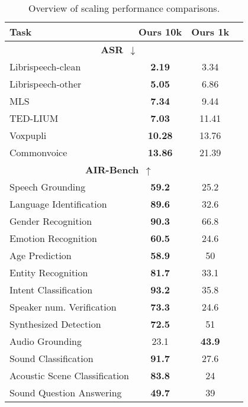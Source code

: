 \begin{table}[t]
    \centering
    \small
    \begin{tabular}{lccr}
    \toprule
    Task & Ours 10k & Ours 1k \\
    \midrule
    \multicolumn{3}{c}{\textbf{ASR}~\ensuremath{\downarrow}} \\
    Librispeech-clean & \textbf{2.19} & 3.34 \\
    Librispeech-other & \textbf{5.05} & 6.86 \\
    MLS & \textbf{7.34} & 9.44 \\
    TED-LIUM & \textbf{7.03} & 11.41 \\
    Voxpupli & \textbf{10.28} & 13.76 \\
    Commonvoice & \textbf{13.86} & 21.39 \\
    \midrule
    \multicolumn{3}{c}{\textbf{AIR-Bench}~\ensuremath{\uparrow}} \\
    Speech Grounding & \textbf{59.2} & 25.2 \\
    Language Identification & \textbf{89.6} & 32.6 \\
    Gender Recognition & \textbf{90.3} & 66.8 \\
    Emotion Recognition & \textbf{60.5} & 24.6 \\
    Age Prediction & \textbf{58.9} & 50 \\
    Entity Recognition & \textbf{81.7} & 33.1 \\
    Intent Classification & \textbf{93.2} & 35.8 \\
    Speaker num. Verification & \textbf{73.3} & 24.6 \\
    Synthesized Detection & \textbf{72.5} & 51 \\
    Audio Grounding & 23.1 & \textbf{43.9} \\
    Sound Classification & \textbf{91.7} & 27.6 \\
    Acoustic Scene Classification & \textbf{83.8} & 24 \\
    Sound Question Answering & \textbf{49.7} & 39 \\
    \bottomrule
    \end{tabular}
    \caption{Overview of scaling performance comparisons.}
    \label{tab:performance_comparison}
\end{table}